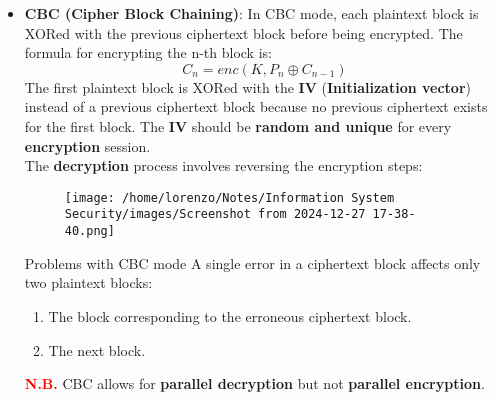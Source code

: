 \begin{itemize}
\begin{itemize}
        \begin{quotebox-red}{Problems with ECB mode}
            \begin{itemize}
            \item \underline{Swapping of ciphertext blocks goes undetected}: since each block is encrypted independently, if two ciphertext blocks are swapped, the decrypted message will still be valid but with blocks in the wrong order. 
            \item \underline{Identical plaintext blocks generate identical ciphertext blocks}: when two plaintext blocks are the same, their corresponding ciphertext blocks will also be identical. This lack of variation reveals patterns in the data, making it vulnerable to known-plaintext attacks 
        \end{itemize}
        \end{quotebox-red}
        \textcolor{red}{\textbf{N.B.}} \textbf{Parallel encryption and decryption are possible} because ECB blocks are independent from each other. 
        \vspace{0.1cm}
        \item \textbf{CBC (Cipher Block Chaining)}: In CBC mode, each plaintext block is XORed with the previous ciphertext block before being encrypted. The formula for encrypting the n-th block is:
        \[C_n=enc(K,P_n \oplus C_{n-1})\]
        The first plaintext block is XORed with the \textbf{IV} (\textbf{Initialization vector}) instead of a previous ciphertext block because no previous ciphertext exists for the first block. The  \textbf{IV} should be \textbf{random and unique} for every  \textbf{encryption} session.\\ 
        The \textbf{decryption} process involves reversing the encryption steps:
        \begin{figure}[h]
            \centering
            \texttt{[image: /home/lorenzo/Notes/Information System Security/images/Screenshot from 2024-12-27 17-38-40.png]}
        \end{figure}
        \begin{quotebox-red}{Problems with CBC mode}
            A single  error in a ciphertext block affects only two plaintext blocks:
            \begin{enumerate}
                \item The block corresponding to the erroneous ciphertext block.
                \item The next block.
            \end{enumerate}
        \end{quotebox-red}
        \textcolor{red}{\textbf{N.B.}} CBC allows for \textbf{parallel decryption} but not \textbf{parallel encryption}.
        \end{itemize}
    

\end{itemize}
